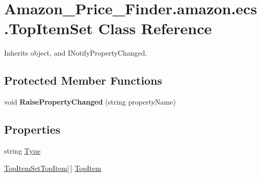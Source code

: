 \hypertarget{class_amazon___price___finder_1_1amazon_1_1ecs_1_1_top_item_set}{\section{Amazon\-\_\-\-Price\-\_\-\-Finder.\-amazon.\-ecs.\-Top\-Item\-Set Class Reference}
\label{class_amazon___price___finder_1_1amazon_1_1ecs_1_1_top_item_set}
}


 




Inherits object, and I\-Notify\-Property\-Changed.

\subsection*{Protected Member Functions}
\begin{DoxyCompactItemize}
\item 
\hypertarget{class_amazon___price___finder_1_1amazon_1_1ecs_1_1_top_item_set_af4d7820ec8534a6e85c9e657fec2c72f}{void {\bfseries Raise\-Property\-Changed} (string property\-Name)}\label{class_amazon___price___finder_1_1amazon_1_1ecs_1_1_top_item_set_af4d7820ec8534a6e85c9e657fec2c72f}

\end{DoxyCompactItemize}
\subsection*{Properties}
\begin{DoxyCompactItemize}
\item 
\hypertarget{class_amazon___price___finder_1_1amazon_1_1ecs_1_1_top_item_set_a156f00d4e420387644d4ab192e9b4e29}{string \hyperlink{class_amazon___price___finder_1_1amazon_1_1ecs_1_1_top_item_set_a156f00d4e420387644d4ab192e9b4e29}{Type}}\label{class_amazon___price___finder_1_1amazon_1_1ecs_1_1_top_item_set_a156f00d4e420387644d4ab192e9b4e29}

\begin{DoxyCompactList}\small\item\em \end{DoxyCompactList}\item 
\hypertarget{class_amazon___price___finder_1_1amazon_1_1ecs_1_1_top_item_set_ae84c4eca7f855875cfde123dc37234e5}{\hyperlink{class_amazon___price___finder_1_1amazon_1_1ecs_1_1_top_item_set_top_item}{Top\-Item\-Set\-Top\-Item}\mbox{[}$\,$\mbox{]} \hyperlink{class_amazon___price___finder_1_1amazon_1_1ecs_1_1_top_item_set_ae84c4eca7f855875cfde123dc37234e5}{Top\-Item}}\label{class_amazon___price___finder_1_1amazon_1_1ecs_1_1_top_item_set_ae84c4eca7f855875cfde123dc37234e5}

\begin{DoxyCompactList}\small\item\em \end{DoxyCompactList}\end{DoxyCompactItemize}
